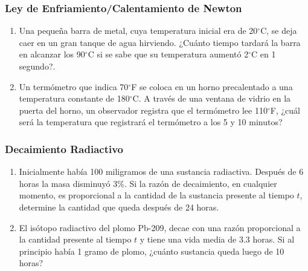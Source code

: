 \subsubsection{Ley de Enfriamiento/Calentamiento de Newton}

\begin{enumerate}
	\item Una pequeña barra de metal, cuya temperatura inicial era de 20\ensuremath{^\circ}C, se deja caer en un gran tanque de agua 
	    hirviendo. ¿Cuánto tiempo tardará la barra en alcanzar los 90\ensuremath{^\circ}C si se sabe que su temperatura aumentó 
	    2\ensuremath{^\circ}C en 1 segundo?.
	\item Un termómetro que indica 70\ensuremath{^\circ}F se coloca en un horno precalentado a una temperatura constante de 
	    180\ensuremath{^\circ}C. A través de una ventana de vidrio en la puerta del horno, un observador registra que el termómetro lee
	    110\ensuremath{^\circ}F, ¿cuál será la temperatura que registrará el termómetro a los 5 y 10 minutos?
\end{enumerate}

\subsubsection{Decaimiento Radiactivo}

\begin{enumerate}
	\item Inicialmente había 100 miligramos de una sustancia radiactiva. Después de 6 horas la masa disminuyó 3\%. Si la razón de 
	    decaimiento, en cualquier momento, es proporcional a la cantidad de la sustancia presente al tiempo $t$, determine la cantidad 
	    que queda después de 24 horas. 
	\item El isótopo radiactivo del plomo Pb-209, decae con una razón proporcional a la cantidad presente al tiempo $t$ y tiene una 
	    vida media de 3.3 horas. Si al principio había 1 gramo de plomo, ¿cuánto sustancia queda luego de 10 horas?
\end{enumerate}

